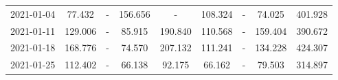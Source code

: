\begin{table*}[t]
\begin{tabular}{ccccccccc}
2021-01-04 &                         77.432 &        - &                        156.656 &               - &                        108.324 &                              - &  {\cellcolor{blue!25} 74.025} &  401.928 \\
2021-01-11 &                        129.006 &        - &   {\cellcolor{blue!25} 85.915} &         190.840 &                        110.568 &                              - &                       159.404 &  390.672 \\
2021-01-18 &                        168.776 &        - &   {\cellcolor{blue!25} 74.570} &         207.132 &                        111.241 &                              - &                       134.228 &  424.307 \\
2021-01-25 &                        112.402 &        - &   {\cellcolor{blue!25} 66.138} &          92.175 &                         66.162 &                              - &                        79.503 &  314.897 \\
\bottomrule
\end{tabular}

\end{table*}

